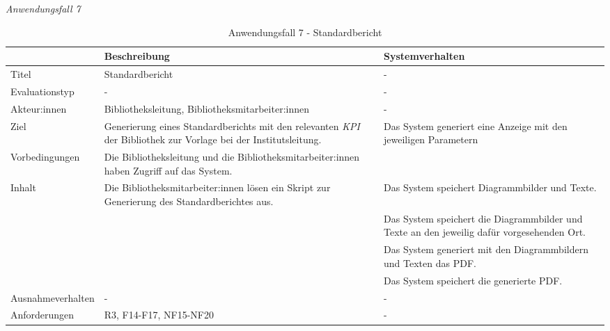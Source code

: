 
\newpage
\noindent
\textit{Anwendungsfall 7}

\begingroup
\setlength{\tabcolsep}{10pt} %
\renewcommand{\arraystretch}{1.25} 
\begin{table}[h]
    \centering
    \begin{adjustbox}{max width=\textwidth}
    \begin{tabular}{lp{7.0cm}p{7.0cm}}
       \toprule
       \textbf{}          & \textbf{Beschreibung} &\textbf{Systemverhalten}\\
       \midrule
        Titel                            &Standardbericht& -\\
        Evaluationstyp                   &-                   & -\\
        Akteur:innen                     &Bibliotheksleitung, Bibliotheksmitarbeiter:innen& -\\
        Ziel                             &Generierung eines Standardberichts mit den relevanten \textit{\acrshort{KPI}} der Bibliothek zur Vorlage bei der Institutsleitung. & Das System generiert eine Anzeige mit den jeweiligen Parametern\\
        Vorbedingungen                   &Die Bibliotheksleitung und die Bibliotheksmitarbeiter:innen haben Zugriff auf das System.& \\
        Inhalt                &Die Bibliotheksmitarbeiter:innen lösen ein Skript zur Generierung des Standardberichtes aus.& Das System speichert Diagrammbilder und Texte.\\
        &                                &Das System speichert die Diagrammbilder und Texte an den jeweilig dafür vorgesehenden Ort.\\
        &                                &Das System generiert mit den Diagrammbildern und Texten das PDF.\\
        &                                &Das System speichert die generierte PDF.\\
       
        Ausnahmeverhalten               &- & -\\

        Anforderungen                   &R3, F14-F17, NF15-NF20& -\\
        \bottomrule
    \end{tabular}
    \end{adjustbox}
    \caption{%
    Anwendungsfall 7 - Standardbericht   }
    \label{tab:AF_Standardbericht}
    \end{table}
\endgroup

